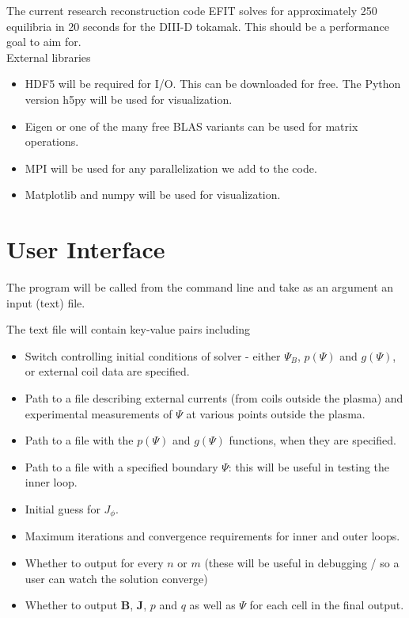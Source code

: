 \documentclass[paper=letter, fontsize=11pt]{scrartcl} %
\begin{document}
The current research reconstruction code EFIT solves for approximately 250 equilibria in 20 seconds for the DIII-D tokamak. This should be a performance goal to aim for. \\

External libraries
\begin{itemize}
\item HDF5 will be required for I/O. This can be downloaded for free. The Python version h5py will be used for visualization.
\item Eigen or one of the many free BLAS variants can be used for matrix operations.
\item MPI will be used for any parallelization we add to the code. 
\item Matplotlib and numpy will be used for visualization.
\end{itemize}


\section{User Interface}

The program will be called from the command line and take as an argument an input (text) file. 

The text file will contain key-value pairs including
\begin{itemize}
\item Switch controlling initial conditions of solver - either $\Psi_B$, $p(\Psi)$ and $g(\Psi)$, or external coil data are specified. 
\item Path to a file describing external currents (from coils outside the plasma) and experimental measurements of $\Psi$ at various points outside the plasma.
\item Path to a file with the $p(\Psi)$ and $g(\Psi)$ functions, when they are specified.
\item Path to a file with a specified boundary $\Psi$: this will be useful in testing the inner loop.
\item Initial guess for $J_\phi$. 
\item Maximum iterations and convergence requirements for inner and outer loops. 
\item Whether to output for every $n$ or $m$ (these will be useful in debugging / so a user can watch the solution converge)
\item Whether to output $\mathbf{B}$, $\mathbf{J}$, $p$ and $q$ as well as $\Psi$ for each cell in the final output.
\end{itemize}
\end{document}
